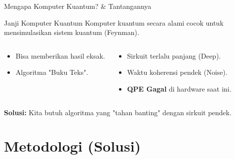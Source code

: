 \documentclass[aspectratio=169, 10pt]{beamer}
\begin{document}
\begin{frame}{Mengapa Komputer Kuantum? \& Tantangannya}
    \begin{alertblock}{Janji Komputer Kuantum}
        Komputer kuantum secara alami cocok untuk mensimulasikan sistem kuantum (Feynman).
    \end{alertblock}

    \vspace{1em}

    \begin{columns}
        \begin{tcolorbox}[colback=green!10!white, colframe=green!50!black, title=Teori (Quantum Phase Estimation)]
            \begin{itemize}
                \item Bisa memberikan hasil eksak.
                \item Algoritma "Buku Teks".
            \end{itemize}
        \end{tcolorbox}
        
        \begin{tcolorbox}[colback=red!10!white, colframe=red!50!black, title=Realita (NISQ)]
            \begin{itemize}
                \item Sirkuit terlalu panjang (Deep).
                \item Waktu koherensi pendek (Noise).
                \item \textbf{QPE Gagal} di hardware saat ini.
            \end{itemize}
        \end{tcolorbox}
    \end{columns}
    
    \vspace{1em}
    \centering
    \textbf{Solusi:} Kita butuh algoritma yang "tahan banting" dengan sirkuit pendek.
\end{frame}

\section{Metodologi (Solusi)}
\end{document}
